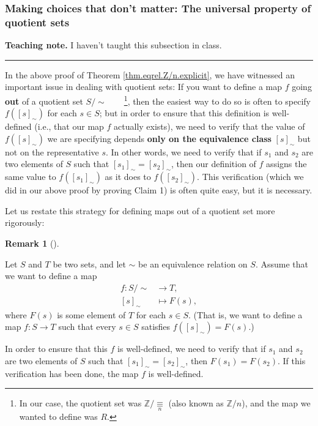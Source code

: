 \documentclass[numbers=enddot,12pt,final,onecolumn,notitlepage]{scrartcl}%
\numberwithin{exer}{subsection}
\theoremstyle{definition}
\newtheorem{remk}[theo]{Remark}
\newenvironment{remark}[1][]
{\begin{remk}[#1]\begin{leftbar}}
{\end{leftbar}\end{remk}}
\newenvironment{teachingnote}[1][Teaching note]{\noindent\textbf{#1.} }{\ \rule{0.5em}{0.5em}}
\newenvironment{teachingnote}{}{}
\begin{document}
\subsubsection{Making choices that don't matter: The universal property of
quotient sets}

\begin{teachingnote}
I haven't taught this subsection in class.
\end{teachingnote}

In the above proof of Theorem \ref{thm.eqrel.Z/n.explicit}, we have witnessed
an important issue in dealing with quotient sets: If you want to define a map
$f$ going \textbf{out} of a quotient set $S/\sim$\ \ \ \ \footnote{In our
case, the quotient set was $\mathbb{Z}/\underset{n}{\equiv}$ (also known as
$\mathbb{Z}/n$), and the map we wanted to define was $R$.}, then the easiest
way to do so is often to specify $f\left(  \left[  s\right]  _{\sim}\right)  $
for each $s\in S$; but in order to ensure that this definition is well-defined
(i.e., that our map $f$ actually exists), we need to verify that the value of
$f\left(  \left[  s\right]  _{\sim}\right)  $ we are specifying depends
\textbf{only on the equivalence class }$\left[  s\right]  _{\sim}$ but not on
the representative $s$. In other words, we need to verify that if $s_{1}$ and
$s_{2}$ are two elements of $S$ such that $\left[  s_{1}\right]  _{\sim
}=\left[  s_{2}\right]  _{\sim}$, then our definition of $f$ assigns the same
value to $f\left(  \left[  s_{1}\right]  _{\sim}\right)  $ as it does to
$f\left(  \left[  s_{2}\right]  _{\sim}\right)  $. This verification (which we
did in our above proof by proving Claim 1) is often quite easy, but it is necessary.

Let us restate this strategy for defining maps out of a quotient set more rigorously:

\begin{remark}
\label{rmk.eqrel.quot.uniprop-as-method}Let $S$ and $T$ be two sets, and let
$\sim$ be an equivalence relation on $S$. Assume that we want to define a map%
\begin{align*}
f:\left.  S/\sim\right.   &  \rightarrow T,\\
\left[  s\right]  _{\sim}  &  \mapsto F\left(  s\right)  ,
\end{align*}
where $F\left(  s\right)  $ is some element of $T$ for each $s\in S$. (That
is, we want to define a map $f:S\rightarrow T$ such that every $s\in S$
satisfies $f\left(  \left[  s\right]  _{\sim}\right)  =F\left(  s\right)  $.)

In order to ensure that this $f$ is well-defined, we need to verify that if
$s_{1}$ and $s_{2}$ are two elements of $S$ such that $\left[  s_{1}\right]
_{\sim}=\left[  s_{2}\right]  _{\sim}$, then $F\left(  s_{1}\right)  =F\left(
s_{2}\right)  $. If this verification has been done, the map $f$ is well-defined.
\end{remark}
\end{document}
